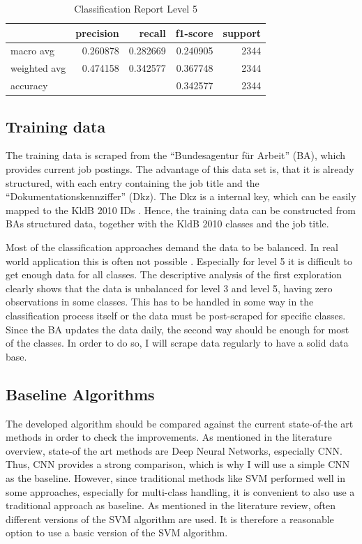 \documentclass[a4paper]{article}
\begin{document}
\begin{table}
  \caption{Classification Report Level 5}
  \begin{center}
    \label{tab:3}
\begin{tabular}{lrrrr}
  \hline
  {} &  precision &    recall &  f1-score &      support \\
  \hline
  macro avg    &   0.260878 &  0.282669 &  0.240905 &  2344\\
  weighted avg &   0.474158 &  0.342577 &  0.367748 &  2344\\
  accuracy     &    &   &  0.342577 &     2344\\
  \hline
  \end{tabular}
\end{center}
\end{table}




\subsection*{Training data}
The training data is scraped from the ``Bundesagentur für Arbeit'' (BA), which provides current job postings. The advantage of this data set is, that it is already structured, with each entry containing the job title and the ``Dokumentationskennziffer'' (Dkz). The Dkz is a internal key, which can be easily mapped to the KldB 2010 IDs \citep{Paulus2013}. Hence, the training data can be constructed from BAs structured data, together with the KldB 2010 classes and the job title. 

Most of the classification approaches demand the data to be balanced. In real world application this is often not possible \citep{Japkowicz2000}. Especially for level 5 it is difficult to get enough data for all classes. The descriptive analysis of the first exploration clearly shows that the data is unbalanced for level 3 and level 5, having zero observations in some classes. This has to be handled in some way in the classification process itself or the data must be post-scraped for specific classes. Since the BA updates the data daily, the second way should be enough for most of the classes. In order to do so, I will scrape data regularly to have a solid data base. 

\subsection*{Baseline Algorithms}
The developed algorithm should be compared against the current state-of-the art methods in order to check the improvements. As mentioned in the literature overview, state-of the art methods are Deep Neural Networks, especially CNN. Thus, CNN provides a strong comparison, which is why I will use a simple CNN as the baseline. However, since traditional methods like SVM performed well in some approaches, especially for multi-class handling, it is convenient to also use a traditional approach as baseline. As mentioned in the literature review, often different versions of the SVM algorithm are used. It is therefore a reasonable option to use a basic version of the SVM algorithm. 
\end{document}
